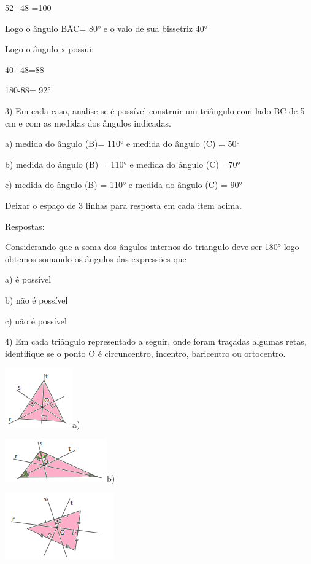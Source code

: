 {52+48 =100

Logo o ângulo BÂC= 80° e o valo de sua bissetriz 40°

Logo o ângulo x possui:

40+48=88

180-88= 92°

3) Em cada caso, analise se é possível construir um triângulo com lado
BC de 5 cm e com as medidas dos ângulos indicadas.

a) medida do ângulo (B)= 110° e medida do ângulo (C) = 50°

b) medida do ângulo (B) = 110° e medida do ângulo (C)= 70°

c) medida do ângulo (B) = 110° e medida do ângulo (C) = 90°

Deixar o espaço de 3 linhas para resposta em cada item acima.

Respostas:

Considerando que a soma dos ângulos internos do triangulo deve ser 180°
logo obtemos somando os ângulos das expressões que

a) é possível

b) não é possível

c) não é possível

4) Em cada triângulo representado a seguir, onde foram traçadas algumas
retas, identifique se o ponto O é circuncentro, incentro, baricentro ou
ortocentro.

\includegraphics[width=1.14583in,height=1.01042in]{./imgSAEB_8_MAT/media/image15.png}a)

\includegraphics[width=1.72917in,height=0.71875in]{./imgSAEB_8_MAT/media/image16.png}b)

\includegraphics[width=1.84375in,height=1.125in]{./imgSAEB_8_MAT/media/image17.png}

}
